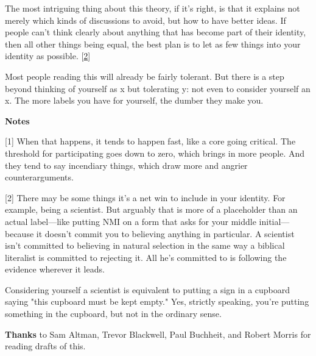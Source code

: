 The most intriguing thing about this theory, if
                  it's right, is that it explains not merely which kinds of
                  discussions to avoid, but how to have better ideas. If people
                  can't think clearly about anything that has become part of
                  their identity, then all other things being equal, the best
                  plan is to let as few things into your identity as possible.
                  [\href{\#f2n}{2}]

Most people reading this will already be fairly
                  tolerant. But there is a step beyond thinking of yourself as x
                  but tolerating y: not even to consider yourself an x. The more
                  labels you have for yourself, the dumber they make you.







\textbf{Notes}

[1] When that happens, it tends to happen fast, like a core
                  going critical. The threshold for participating goes down to
                  zero, which brings in more people. And they tend to say
                  incendiary things, which draw more and angrier
                  counterarguments.

[2] There may be some things it's a net win to include in your
                  identity. For example, being a scientist. But arguably that is
                  more of a placeholder than an actual label---like putting
                  NMI on a form that asks for your middle initial---because
                  it doesn't commit you to believing anything in particular. A
                  scientist isn't committed to believing in natural selection in
                  the same way a biblical literalist is committed to rejecting
                  it. All he's committed to is following the evidence wherever
                  it leads.

Considering yourself a scientist is
                  equivalent to putting a sign in a cupboard saying "this
                  cupboard must be kept empty." Yes, strictly speaking, you're
                  putting something in the cupboard, but not in the ordinary
                  sense.

\textbf{Thanks} to Sam Altman, Trevor
                  Blackwell, Paul Buchheit, and Robert Morris for reading drafts
                  of this.


              
            
          
